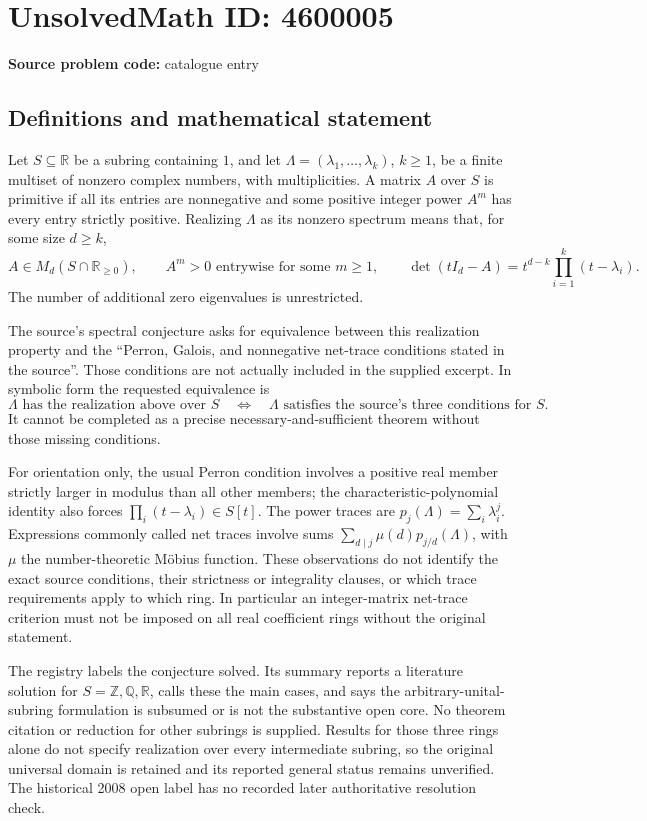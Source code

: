 \documentclass[11pt]{article}
\begin{document}
\section*{UnsolvedMath ID: 4600005}
\textbf{Source problem code:} catalogue entry
\subsection{Definitions and mathematical statement}
Let \(S\subseteq\mathbb R\) be a subring containing \(1\), and let \(\Lambda=(\lambda_1,\ldots,\lambda_k)\), \(k\ge1\), be a finite multiset of nonzero complex numbers, with multiplicities. A matrix \(A\) over \(S\) is primitive if all its entries are nonnegative and some positive integer power \(A^m\) has every entry strictly positive. Realizing \(\Lambda\) as its nonzero spectrum means that, for some size \(d\ge k\),
\[
 A\in M_d(S\cap\mathbb R_{\ge0}),\qquad A^m>0\text{ entrywise for some }m\ge1,
 \qquad
 \det(tI_d-A)=t^{d-k}\prod_{i=1}^k(t-\lambda_i).
\]
The number of additional zero eigenvalues is unrestricted.

The source's spectral conjecture asks for equivalence between this realization property and the ``Perron, Galois, and nonnegative net-trace conditions stated in the source''. Those conditions are not actually included in the supplied excerpt. In symbolic form the requested equivalence is
\[
 \Lambda\text{ has the realization above over }S
 \quad\Longleftrightarrow\quad
 \Lambda\text{ satisfies the source's three conditions for }S.
\]
It cannot be completed as a precise necessary-and-sufficient theorem without those missing conditions.

For orientation only, the usual Perron condition involves a positive real member strictly larger in modulus than all other members; the characteristic-polynomial identity also forces \(\prod_i(t-\lambda_i)\in S[t]\). The power traces are \(p_j(\Lambda)=\sum_i\lambda_i^j\). Expressions commonly called net traces involve sums \(\sum_{d\mid j}\mu(d)p_{j/d}(\Lambda)\), with \(\mu\) the number-theoretic M\"obius function. These observations do not identify the exact source conditions, their strictness or integrality clauses, or which trace requirements apply to which ring. In particular an integer-matrix net-trace criterion must not be imposed on all real coefficient rings without the original statement.

The registry labels the conjecture solved. Its summary reports a literature solution for \(S=\mathbb Z,\mathbb Q,\mathbb R\), calls these the main cases, and says the arbitrary-unital-subring formulation is subsumed or is not the substantive open core. No theorem citation or reduction for other subrings is supplied. Results for those three rings alone do not specify realization over every intermediate subring, so the original universal domain is retained and its reported general status remains unverified. The historical 2008 open label has no recorded later authoritative resolution check.
\end{document}
